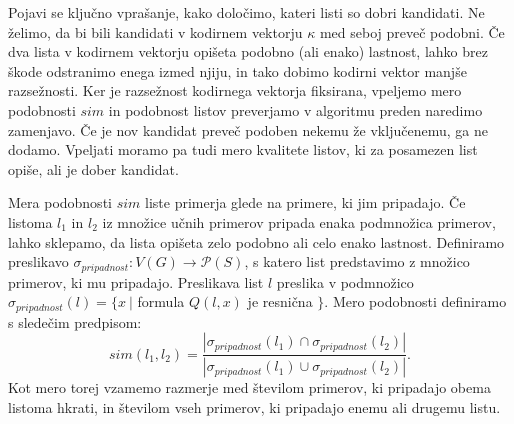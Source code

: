 \documentclass[12pt,a4paper,twoside]{article}
\theoremstyle{definition} %
\theoremstyle{plain} %
\numberwithin{equation}{section}  %
\begin{document}

Pojavi se ključno vprašanje, kako določimo, kateri listi so dobri kandidati. 
Ne želimo, da bi bili kandidati v kodirnem vektorju $\kappa$ med seboj preveč podobni. 
Če dva lista v kodirnem vektorju opišeta podobno (ali enako) lastnost, lahko brez škode odstranimo enega izmed njiju, in tako dobimo kodirni vektor manjše razsežnosti. 
Ker je razsežnost kodirnega vektorja fiksirana, vpeljemo mero podobnosti $sim$ in podobnost listov preverjamo v algoritmu preden naredimo zamenjavo. 
Če je nov kandidat preveč podoben nekemu že vključenemu, ga ne dodamo.
Vpeljati moramo pa tudi mero kvalitete listov, ki za posamezen list opiše, ali je dober kandidat.

Mera podobnosti $sim$ liste primerja glede na primere, ki jim pripadajo. 
Če listoma $l_1$ in $l_2$ iz množice učnih primerov pripada enaka podmnožica primerov, lahko sklepamo, da lista opišeta zelo podobno ali celo enako lastnost.
Definiramo preslikavo $\sigma_{\mathit{pripadnost}}: V(G) \rightarrow \mathcal{P}(S)$, s katero list predstavimo z množico primerov, ki mu pripadajo.
Preslikava list $l$ preslika v podmnožico $\sigma_{\mathit{pripadnost}}(l) = \{x\ |$ formula $Q(l,x)$ je resnična $\}$.
Mero podobnosti definiramo s sledečim predpisom:
\[
	sim(l_1, l_2) = \frac{|\sigma_{pripadnost}(l_1) \cap \sigma_{pripadnost}(l_2)|}{|\sigma_{pripadnost}(l_1) \cup \sigma_{pripadnost}(l_2)|}.
\]
Kot mero torej vzamemo razmerje med številom primerov, ki pripadajo obema listoma hkrati, in številom vseh primerov, ki pripadajo enemu ali drugemu listu.
\end{document}
